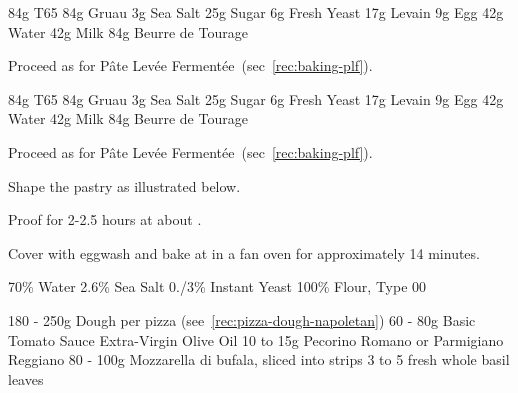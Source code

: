 \label{rec:baking-crossiant}

\begin{ingreds}
	84g T65
	84g Gruau
	3g Sea Salt
	25g Sugar
	6g Fresh Yeast
	17g Levain
	9g Egg
	42g Water
	42g Milk
	84g Beurre de Tourage
\end{ingreds}

\begin{method}[]
Proceed as for P\^ate Lev\'ee Ferment\'ee~(sec~\ref{rec:baking-plf}).

\end {method}

\label{rec:baking-pain-au-chocolat}

\begin{ingreds}
	84g T65
	84g Gruau
	3g Sea Salt
	25g Sugar
	6g Fresh Yeast
	17g Levain
	9g Egg
	42g Water
	42g Milk
	84g Beurre de Tourage
\end{ingreds}

\begin{method}[]
Proceed as for P\^ate Lev\'ee Ferment\'ee~(sec~\ref{rec:baking-plf}).

Shape the pastry as illustrated below.

Proof for 2-2.5 hours at about .

Cover with eggwash and bake at  in a fan oven for approximately 14 minutes.





\end {method}


\label{rec:pizza-dough-napoletan}

\begin{ingreds}
	70\% Water
	2.6\% Sea Salt
	0./3\% Instant Yeast
	100\% Flour, Type 00
\end{ingreds}

\label{rec:pizza-margherita}

\begin{ingreds}
	180 - 250g Dough per pizza (see~\ref{rec:pizza-dough-napoletan})
	60 - 80g Basic Tomato Sauce
	Extra-Virgin Olive Oil 
	10 to 15g Pecorino Romano or Parmigiano Reggiano
	80 - 100g Mozzarella di bufala, sliced into strips
	3 to 5 fresh whole basil leaves
\end{ingreds}

